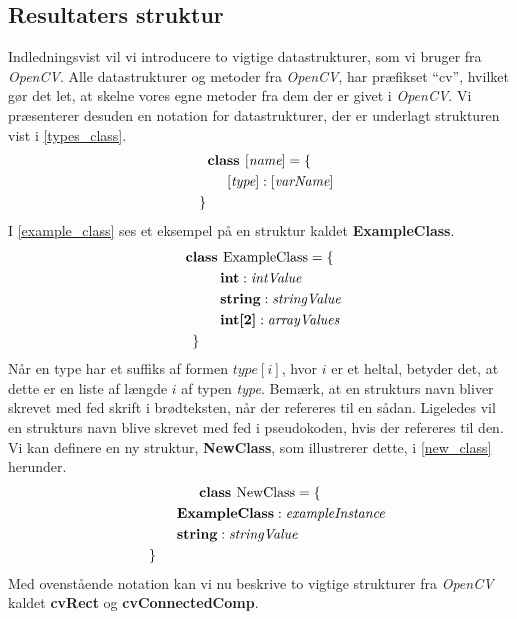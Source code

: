 {\subsection{Resultaters struktur\label{resultat_struktur}}
Indledningsvist vil vi introducere to vigtige datastrukturer, som vi
bruger fra \emph{OpenCV}. Alle datastrukturer og metoder fra
\emph{OpenCV}, har præfikset ``cv'', hvilket gør det let, at skelne
vores egne metoder fra dem der er givet i \emph{OpenCV}. Vi præsenterer
desuden en notation for datastrukturer, der er underlagt strukturen vist
i \eqref{types_class}.
\begin{multline}
    \textbf{class~} [\textit{name}] = \{ \\
    \shoveleft{\qquad[\textit{type}] : [\textit{varName}]} \\
    \shoveleft{\}}\shoveright{}
    \label{types_class}
\end{multline}
I \eqref{example_class} ses et eksempel på en struktur kaldet
\textbf{ExampleClass}.
\begin{multline}
    \textbf{class~} \textrm{ExampleClass} = \{ \\
    \shoveleft{\qquad\textbf{int} : \textit{intValue}} \\
    \shoveleft{\qquad\textbf{string} : \textit{stringValue}} \\
    \shoveleft{\qquad\textbf{int[2]} : \textit{arrayValues}} \\
    \shoveleft{\}}\shoveright{}
    \label{example_class}
\end{multline}
Når en type har et suffiks af formen $\textit{type}[i]$, hvor $i$ er et
heltal, betyder det, at dette er en liste af længde $i$ af typen
\textit{type}.  Bemærk, at en strukturs navn bliver skrevet med fed
skrift i brødteksten, når der refereres til en sådan. Ligeledes vil en
strukturs navn blive skrevet med fed i pseudokoden, hvis der refereres
til den. Vi kan definere en ny struktur, \textbf{NewClass}, som
illustrerer dette, i \eqref{new_class} herunder.
\begin{multline}
    \textbf{class~} \textrm{NewClass} = \{ \\
    \shoveleft{\qquad\textbf{ExampleClass} : \textit{exampleInstance}} \\
    \shoveleft{\qquad\textbf{string} : \textit{stringValue}} \\
    \shoveleft{\}}\shoveright{}
    \label{new_class}
\end{multline}
Med ovenstående notation kan vi nu beskrive to vigtige strukturer fra
\emph{OpenCV} kaldet \textbf{cvRect} og \textbf{cvConnectedComp}.

}
